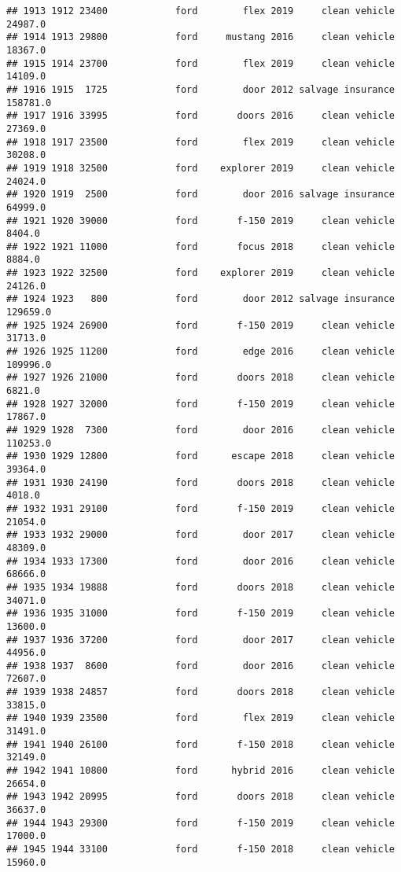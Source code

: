 \documentclass[
]{article}
\begin{document}
\begin{verbatim}
## 1913 1912 23400            ford        flex 2019     clean vehicle   24987.0
## 1914 1913 29800            ford     mustang 2016     clean vehicle   18367.0
## 1915 1914 23700            ford        flex 2019     clean vehicle   14109.0
## 1916 1915  1725            ford        door 2012 salvage insurance  158781.0
## 1917 1916 33995            ford       doors 2016     clean vehicle   27369.0
## 1918 1917 23500            ford        flex 2019     clean vehicle   30208.0
## 1919 1918 32500            ford    explorer 2019     clean vehicle   24024.0
## 1920 1919  2500            ford        door 2016 salvage insurance   64999.0
## 1921 1920 39000            ford       f-150 2019     clean vehicle    8404.0
## 1922 1921 11000            ford       focus 2018     clean vehicle    8884.0
## 1923 1922 32500            ford    explorer 2019     clean vehicle   24126.0
## 1924 1923   800            ford        door 2012 salvage insurance  129659.0
## 1925 1924 26900            ford       f-150 2019     clean vehicle   31713.0
## 1926 1925 11200            ford        edge 2016     clean vehicle  109996.0
## 1927 1926 21000            ford       doors 2018     clean vehicle    6821.0
## 1928 1927 32000            ford       f-150 2019     clean vehicle   17867.0
## 1929 1928  7300            ford        door 2016     clean vehicle  110253.0
## 1930 1929 12800            ford      escape 2018     clean vehicle   39364.0
## 1931 1930 24190            ford       doors 2018     clean vehicle    4018.0
## 1932 1931 29100            ford       f-150 2019     clean vehicle   21054.0
## 1933 1932 29000            ford        door 2017     clean vehicle   48309.0
## 1934 1933 17300            ford        door 2016     clean vehicle   68666.0
## 1935 1934 19888            ford       doors 2018     clean vehicle   34071.0
## 1936 1935 31000            ford       f-150 2019     clean vehicle   13600.0
## 1937 1936 37200            ford        door 2017     clean vehicle   44956.0
## 1938 1937  8600            ford        door 2016     clean vehicle   72607.0
## 1939 1938 24857            ford       doors 2018     clean vehicle   33815.0
## 1940 1939 23500            ford        flex 2019     clean vehicle   31491.0
## 1941 1940 26100            ford       f-150 2018     clean vehicle   32149.0
## 1942 1941 10800            ford      hybrid 2016     clean vehicle   26654.0
## 1943 1942 20995            ford       doors 2018     clean vehicle   36637.0
## 1944 1943 29300            ford       f-150 2019     clean vehicle   17000.0
## 1945 1944 33100            ford       f-150 2018     clean vehicle   15960.0

\end{verbatim}
\end{document}
